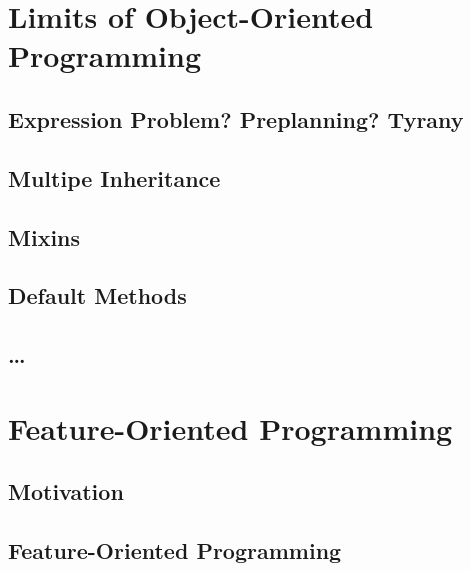 \documentclass[
	aspectratio=169, %
	8pt, %
	handout, %
]{beamer}
\subtitle{7. Languages for Features}
\author{Thomas Thüm}
\begin{document}


\section{Limits of Object-Oriented Programming}

\subsection{Expression Problem? Preplanning? Tyrany}
\subsection{Multipe Inheritance}
\subsection{Mixins}
\subsection{Default Methods}
\subsection{\ldots}

%

\lessonslearned{
	\item \ldots
}{
	\item \ldots
}{
	\ldots
}

\sectionend

\section{Feature-Oriented Programming}

\subsection{Motivation}
\subsection{Feature-Oriented Programming}
\end{document}
